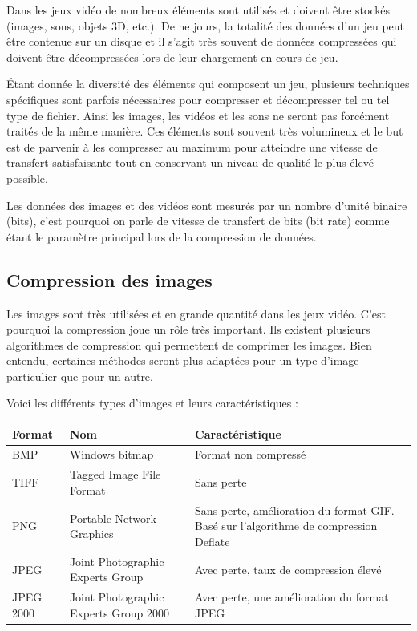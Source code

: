 \documentclass[a4paper, 11pt]{article} %
\begin{document}
Dans les jeux vidéo de nombreux éléments sont utilisés et doivent être stockés (images, sons, objets 3D, etc.). De ne jours, la totalité des données d'un jeu peut être contenue sur un disque et il s'agit très souvent de données compressées qui doivent être décompressées lors de leur chargement en cours de jeu.

Étant donnée la diversité des éléments qui composent un jeu, plusieurs techniques spécifiques sont parfois nécessaires pour compresser et décompresser tel ou tel type de fichier. Ainsi les images, les vidéos et les sons ne seront pas forcément traités de la même manière. Ces éléments sont souvent très volumineux et le but est de parvenir à les compresser au maximum pour atteindre une vitesse de transfert satisfaisante tout en conservant un niveau de qualité le plus élevé possible. 

Les données des images et des vidéos sont mesurés par un nombre d'unité binaire (bits), c'est pourquoi on parle de vitesse de transfert de bits (bit rate) comme étant le paramètre principal lors de la compression de données. 

\newpage
\subsection{Compression des images}
Les images sont très utilisées et en grande quantité dans les jeux vidéo. C'est pourquoi la compression joue un rôle très important. Ils existent plusieurs algorithmes de compression qui permettent de comprimer les images. Bien entendu, certaines méthodes seront plus adaptées pour un type d'image particulier que pour un autre. 

Voici les différents types d'images et leurs caractéristiques : 

\begin{tabular}{|p{}|p{}|p{}|}
  \hline
  Format & Nom & Caractéristique\\\hline\hline
  BMP&Windows bitmap&Format non compressé\\\hline
	TIFF&Tagged Image File Format&Sans perte\\\hline
	PNG&Portable Network Graphics&Sans perte, amélioration du format GIF. Basé sur l'algorithme de compression Deflate\\\hline
	JPEG&Joint Photographic Experts Group&Avec perte, taux de compression élevé\\\hline
	JPEG 2000&Joint Photographic Experts Group 2000&Avec perte, une amélioration du format JPEG\\\hline
\end{tabular}
\end{document}
